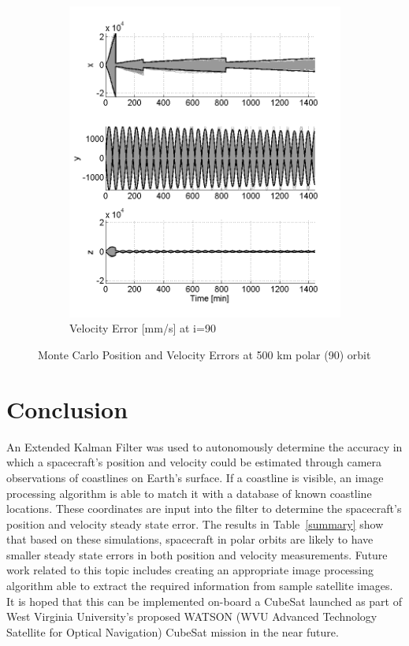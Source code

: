 \documentclass[]{aiaa-tc}%
\begin{document}
\begin{figure}[h!]
\begin{subfigure}{.49\textwidth}
		\includegraphics{MC_vel90_500}
		\caption{Velocity Error [mm/s] at i=90\degree}
		\label{fig:mcvel90_500}
	\end{subfigure}
	\caption{Monte Carlo Position and Velocity Errors at 500 km polar (90\degree) orbit}
	\label{fig:mc90_500}
\end{figure}
%
\section{Conclusion}
An Extended Kalman Filter was used to autonomously determine the accuracy in which a spacecraft's position and velocity could be estimated through camera observations of coastlines on Earth's surface.  If a coastline is visible, an image processing algorithm is able to match it with a database of known coastline locations.  These coordinates are input into the filter to determine the spacecraft's position and velocity steady state error.  The results in Table~\ref{summary} show that based on these simulations, spacecraft in polar orbits are likely to have smaller steady state errors in both position and velocity measurements.  Future work related to this topic includes creating an appropriate image processing algorithm able to extract the required information from sample satellite images.  It is hoped that this can be implemented on-board a CubeSat launched as part of West Virginia University's proposed WATSON (WVU Advanced Technology Satellite for Optical Navigation) CubeSat mission in the near future.
%
\clearpage
\end{document}
